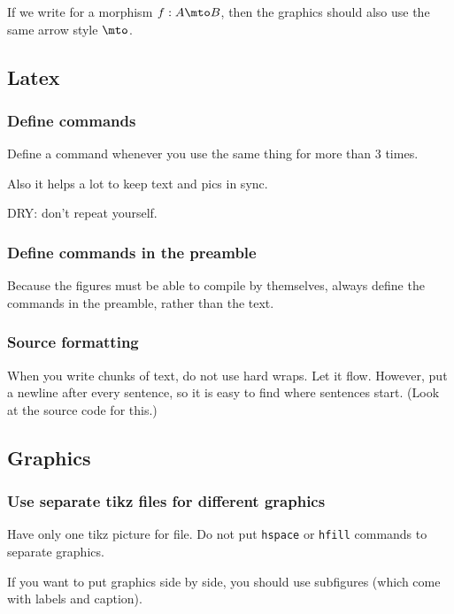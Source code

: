 If we write for a morphism $f: A \mto B$, then the graphics should also use the
same arrow style $\mto$.


\subsection*{Latex}

\subsubsection*{Define commands }

Define a command whenever you use the same thing for more than 3 times.

Also it helps a lot to keep text and pics in sync.

DRY: don't repeat yourself.



\subsubsection*{Define commands in the preamble }

Because the figures must be able to compile by themselves, always define the commands in the preamble, rather than the text.



\subsubsection*{Source formatting}

When you write chunks of text, do not use hard wraps. %
Let it flow. %
However, put a newline after every sentence, so it is easy to find where sentences start.
(Look at the source code for this.)


\subsection*{Graphics}

\subsubsection*{Use separate tikz files for different graphics}

Have only one tikz picture for file. Do not put \texttt{hspace} or \texttt{hfill} commands to separate graphics.


If you want to put graphics side by side, you should use subfigures (which come with labels and caption).


